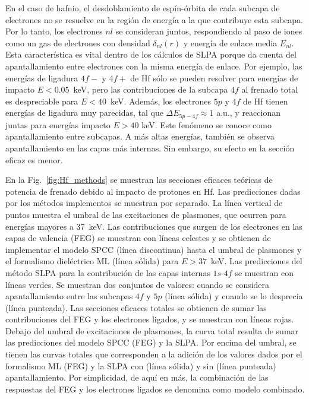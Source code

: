 En el caso de hafnio, el desdoblamiento de espín-órbita de cada subcapa 
de electrones no se resuelve en la región de energía a la que contribuye 
esta subcapa. Por lo tanto, los electrones $nl$ se consideran juntos, 
respondiendo al paso de iones como un gas de electrones con densidad 
$\delta_{nl}(r)$ y energía de enlace media $E_{nl}$. Esta característica 
es vital dentro de los cálculos de SLPA porque da cuenta del 
apantallamiento entre electrones con la misma energía de enlace.
Por ejemplo, las energías de ligadura $4f-$ y $4f+$ de Hf sólo se 
pueden resolver para energías de impacto $E<0.05$~keV, pero las 
contribuciones de la subcapa $4f$ al frenado total es despreciable para
$E<40$~keV. Además, los electrones $5p$ y $4f$ de Hf tienen energías de 
ligadura muy parecidas, tal que $\Delta E_{5p-4f} \approx 1$ a.u., y 
reaccionan juntas para energías impacto $E>40$ keV. Este fenómeno se 
conoce como apantallamiento entre subcapas. A más altas energías, 
también se observa apantallamiento en las capas más internas. Sin 
embargo, su efecto en la sección eficaz es menor.

En la Fig.~\ref{fig:Hf_methods} se muestran las secciones eficaces 
teóricas de potencia de frenado debido al impacto de protones en Hf. 
Las predicciones dadas por los métodos implementos se muestran por 
separado. La línea vertical de puntos muestra el umbral de las 
excitaciones de plasmones, que ocurren para energías mayores a 37~keV. 
Las contribuciones que surgen de los electrones en las capas 
de valencia (FEG) se muestran con líneas celestes y se obtienen de 
implementar el modelo SPCC (línea discontinua) hasta el umbral de 
plasmones y el formalismo dieléctrico ML (línea sólida) para $E>37$~keV. 
Las predicciones del método SLPA para la contribución de las capas 
internas $1s$-$4f$ se muestran con líneas verdes. Se muestran dos 
conjuntos de valores: cuando se considera apantallamiento entre las 
subcapas $4f$ y $5p$ (línea sólida) y cuando se lo desprecia (línea 
punteada). Las secciones eficaces totales se obtienen de sumar las 
contribuciones del FEG y los electrones ligados, y se muestran con 
líneas rojas. Debajo del umbral de excitaciones de plasmones, la curva 
total resulta de sumar las predicciones del modelo SPCC (FEG) y la SLPA. 
Por encima del umbral, se tienen las curvas totales que corresponden a 
la adición de los valores dados por el formalismo ML (FEG) y la SLPA
con (línea sólida) y sin (línea punteada) apantallamiento. 
Por simplicidad, de aquí en más, la combinación de las respuestas del 
FEG y los electrones ligados se denomina como modelo combinado.

